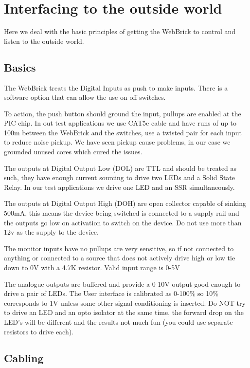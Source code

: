 \section {Interfacing to the outside world}

Here we deal with the basic principles of getting the WebBrick to control and listen to the outside world.

\subsection {Basics}

The WebBrick treats the Digital Inputs as push to make inputs.  There is a software option that can allow
the use on off switches.

To action, the push button should ground the input, pullups are enabled at the PIC chip.  
In out test applications we use CAT5e cable and have runs of up to 100m between the WebBrick 
and the switches, use a twisted pair for each input to reduce noise pickup.  We have seen 
pickup cause problems, in our case we grounded unused cores which cured the issues.

The outputs at Digital Output Low (DOL) are TTL and should be treated as such, they have enough current 
sourcing to drive two LEDs and a Solid State Relay.  In our test applications we drive 
one LED and an SSR simultaneously.

The outputs at Digital Output High (DOH) are open collector capable of sinking 500mA, this means 
the device being switched is connected to a supply rail and the outputs go low on activation to 
switch on the device. Do not use more than 12v as the supply to the device.

The monitor inputs have no pullups are very sensitive, so if not connected to anything or 
connected to a source that does not actively drive high or low tie down to 0V with a 4.7K resistor. 
Valid input range is 0-5V

The analogue outputs are buffered and provide a 0-10V output good enough to drive a pair of LEDs. 
The User interface is
calibrated as 0-100\% so 10\% corresponds to 1V unless some other signal conditioning is inserted.
Do NOT try to drive an LED and an opto isolator at the same time, the forward drop on the LED's will 
be different and the results not much fun (you could use separate resistors to drive each).

\subsection{Cabling}


